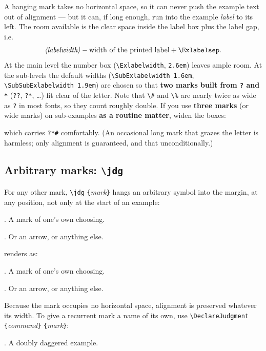 \documentclass[11pt,a4paper]{article}
\newcommand{\cs}[1]{\texttt{\textbackslash #1}}
\newcommand{\meta}[1]{\textrm{\itshape\textlangle#1\textrangle}}
\newcommand{\marg}[1]{\penalty300 \texttt{\{}\meta{#1}\texttt{\}}}
\newcommand{\rendered}{\par\medskip\noindent\textcolor{gray!70}{\small renders as:}\par\nobreak\smallskip}
\newcommand{\afterex}{\par\addvspace{\medskipamount}}
\begin{document}
A hanging mark takes no horizontal space, so it can never push the example
text out of alignment --- but it can, if long enough, run into the example
\emph{label} to its left. The room available is the clear space inside the
label box plus the label gap, i.e.
\[
  \meta{labelwidth} - \hbox{width of the printed label} + \cs{Exlabelsep}.
\]
At the main level the number box (\cs{Exlabelwidth}, \texttt{2.6em}) leaves
ample room. At the sub-levels the default widths
(\cs{SubExlabelwidth}~\texttt{1.6em}, \cs{SubSubExlabelwidth}~\texttt{1.9em})
are chosen so that \textbf{two marks built from \texttt{?} and \texttt{*}}
(\texttt{??}, \texttt{?*}, \dots) fit clear of the letter. Note that
\cs{\#} and \cs{\%} are nearly twice as wide as \texttt{?} in most fonts,
so they count roughly double. If you use \textbf{three marks} (or wide
marks) on sub-examples \textbf{as a routine matter}, widen the boxes:

\begin{code}
\setlength{\SubExlabelwidth}{2.4em}
\setlength{\SubSubExlabelwidth}{2.5em}
\end{code}

\noindent which carries \texttt{?*\#} comfortably. (An occasional long
mark that grazes the letter is harmless; only alignment is guaranteed, and
that unconditionally.)

\subsection{Arbitrary marks: \cs{jdg}}\label{sec:jdgmanual}

For any other mark, \cs{jdg}\marg{mark} hangs an arbitrary symbol into the
margin, at any position, not only at the start of an example:

\begin{code}
\ex. \jdg{\dag}A mark of one's own choosing.

\ex. \jdg{$\to$}Or an arrow, or anything else.
\end{code}

\rendered
\ex. \jdg{\dag}A mark of one's own choosing.

\ex. \jdg{$\to$}Or an arrow, or anything else.

\afterex
Because the mark occupies no horizontal space, alignment is preserved
whatever its width. To give a recurrent mark a name of its own, use
\cs{DeclareJudgment}\marg{command}\marg{mark}:

\begin{code}
\DeclareJudgment{\dubious}{\dag\dag}
\ex. \dubious A doubly daggered example.
\end{code}
\end{document}
